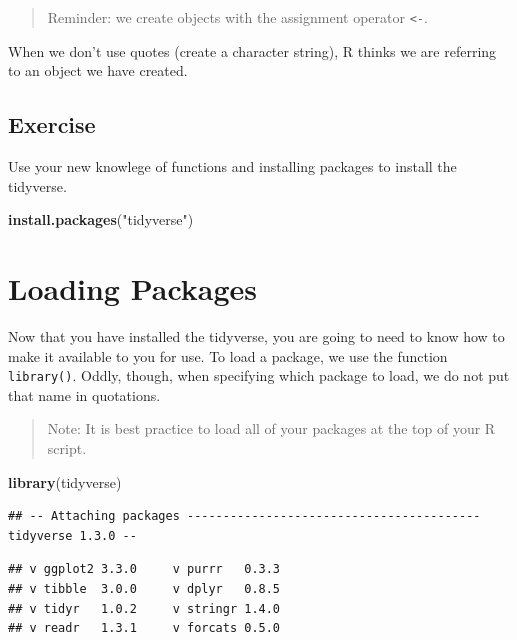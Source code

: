 \documentclass[
]{book}
\newenvironment{Shaded}{\begin{snugshade}}{\end{snugshade}}
\newcommand{\KeywordTok}[1]{\textcolor[rgb]{0.13,0.29,0.53}{\textbf{#1}}}
\newcommand{\NormalTok}[1]{#1}
\newcommand{\StringTok}[1]{\textcolor[rgb]{0.31,0.60,0.02}{#1}}
\begin{document}
\begin{quote}
Reminder: we create objects with the assignment operator \texttt{\textless{}-}.
\end{quote}

When we don't use quotes (create a character string), R thinks we are referring to an object we have created.

\hypertarget{exercise}{%
\subsection{Exercise}\label{exercise}}

Use your new knowlege of functions and installing packages to install the tidyverse.

\begin{Shaded}
\begin{Highlighting}[]
\KeywordTok{install.packages}\NormalTok{(}\StringTok{"tidyverse"}\NormalTok{)}
\end{Highlighting}
\end{Shaded}

\hypertarget{loading-packages}{%
\section{Loading Packages}\label{loading-packages}}

Now that you have installed the tidyverse, you are going to need to know how to make it available to you for use. To load a package, we use the function \texttt{library()}. Oddly, though, when specifying which package to load, we do not put that name in quotations.

\begin{quote}
Note: It is best practice to load all of your packages at the top of your R script.
\end{quote}

\begin{Shaded}
\begin{Highlighting}[]
\KeywordTok{library}\NormalTok{(tidyverse)}
\end{Highlighting}
\end{Shaded}

\begin{verbatim}
## -- Attaching packages ----------------------------------------- tidyverse 1.3.0 --
\end{verbatim}

\begin{verbatim}
## v ggplot2 3.3.0     v purrr   0.3.3
## v tibble  3.0.0     v dplyr   0.8.5
## v tidyr   1.0.2     v stringr 1.4.0
## v readr   1.3.1     v forcats 0.5.0
\end{verbatim}
\end{document}
